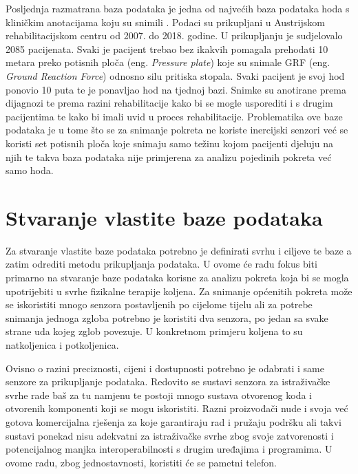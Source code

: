 \documentclass[times, utf8, diplomski]{fer}
\begin{document}
Posljednja razmatrana baza podataka je jedna od najvećih baza podataka hoda s kliničkim anotacijama koju su snimili \cite{pressurePlate}.
Podaci su prikupljani u Austrijskom rehabilitacijskom centru od 2007. do 2018. godine. U prikupljanju je sudjelovalo 2085 pacijenata.
Svaki je pacijent trebao bez ikakvih pomagala prehodati 10 metara preko potisnih ploča (eng. \textit{Pressure plate}) koje su snimale
GRF (eng. \textit{Ground Reaction Force}) odnosno silu pritiska stopala. Svaki pacijent je svoj hod ponovio 10 puta te je ponavljao
hod na tjednoj bazi. Snimke su anotirane prema dijagnozi te prema razini rehabilitacije kako bi se mogle usporediti i s drugim
pacijentima te kako bi imali uvid u proces rehabilitacije. Problematika ove baze podataka je u tome što se za snimanje pokreta ne
koriste inercijski senzori već se koristi set potisnih ploča koje snimaju samo težinu kojom pacijenti djeluju na njih te takva baza 
podataka nije primjerena za analizu pojedinih pokreta već samo hoda.



\section{Stvaranje vlastite baze podataka}
Za stvaranje vlastite baze podataka potrebno je definirati svrhu i ciljeve te baze a zatim odrediti metodu prikupljanja podataka. U ovome će radu
fokus biti primarno na stvaranje baze podataka korisne za analizu pokreta koja bi se mogla upotrijebiti u svrhe fizikalne terapije koljena.
Za snimanje općenitih pokreta može se iskoristiti mnogo senzora postavljenih po cijelome tijelu ali za potrebe snimanja jednoga zgloba potrebno je 
koristiti dva senzora, po jedan sa svake strane uda kojeg zglob povezuje. U konkretnom primjeru koljena to su natkoljenica i potkoljenica.

Ovisno o razini preciznosti, cijeni i dostupnosti potrebno je odabrati i same senzore za prikupljanje podataka. Redovito se sustavi senzora
za istraživačke svrhe rade baš za tu namjenu te postoji mnogo sustava otvorenog koda i otvorenih komponenti koji se mogu iskoristiti. Razni
proizvođači nude i svoja već gotova komercijalna rješenja za koje garantiraju rad i pružaju podršku ali takvi sustavi ponekad nisu adekvatni za
istraživačke svrhe zbog svoje zatvorenosti i potencijalnog manjka interoperabilnosti s drugim uređajima i programima. U ovome radu, zbog jednostavnosti,
koristiti će se pametni telefon.
\end{document}
